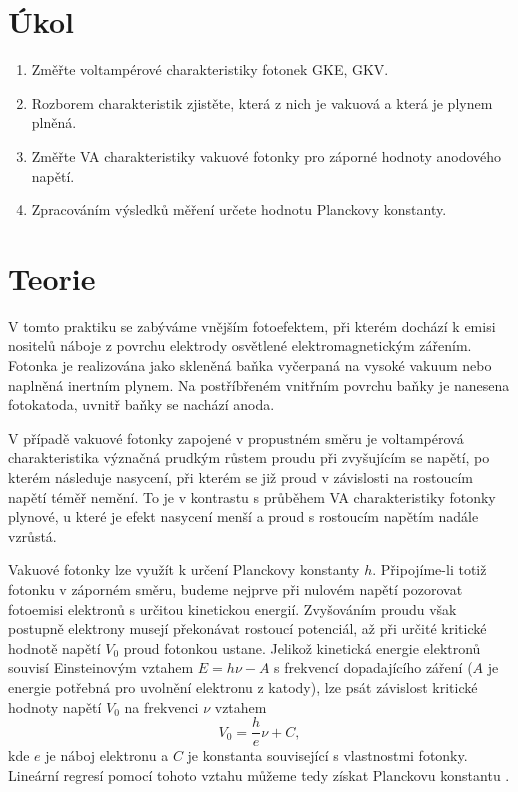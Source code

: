 \documentclass{protokol}
\begin{document}
  \section*{Úkol}

    \begin{enumerate}
      \item Změřte voltampérové charakteristiky fotonek GKE, GKV.
      \item Rozborem charakteristik zjistěte, která z nich je vakuová a která je plynem plněná.
      \item Změřte VA charakteristiky vakuové fotonky pro záporné hodnoty anodového napětí.
      \item Zpracováním výsledků měření určete hodnotu Planckovy konstanty.
    \end{enumerate}

  \section*{Teorie}

    V tomto praktiku se zabýváme vnějším fotoefektem, při kterém dochází k emisi nositelů náboje z povrchu elektrody osvětlené elektromagnetickým zářením. Fotonka je realizována jako skleněná baňka vyčerpaná na vysoké vakuum nebo naplněná inertním plynem. Na postří\-břeném vnitřním povrchu baňky je nanesena fotokatoda, uvnitř baňky se nachází anoda. 
    
    V případě vakuové fotonky zapojené v propustném směru je voltampérová charakteristika význačná prudkým růstem proudu při zvyšujícím se napětí, po kterém následuje nasycení, při kterém se již proud v závislosti na rostoucím napětí téměř nemění. To je v kontrastu s průběhem VA charakteristiky fotonky plynové, u které je efekt nasycení menší a proud s rostoucím napětím nadále vzrůstá.

    Vakuové fotonky lze využít k určení Planckovy konstanty $h$. Připojíme-li totiž fotonku v záporném směru, budeme nejprve při nulovém napětí pozorovat fotoemisi elektronů s určitou kinetickou energií. Zvyšováním proudu však postupně elektrony musejí překonávat rostoucí potenciál, až při určité kritické hodnotě napětí $V_0$ proud fotonkou ustane. Jelikož kinetická energie elektronů souvisí Einsteinovým vztahem $E = h \nu - A$ s frekvencí dopadajícího záření ($A$ je energie potřebná pro uvolnění elektronu z katody), lze psát závislost kritické hodnoty napětí $V_0$ na frekvenci $\nu$ vztahem 
    \begin{equation} \label{eq:vztah}
      V_0 = \frac{h}{e} \nu + C, 
    \end{equation}
    kde $e$ je náboj elektronu a $C$ je konstanta související s vlastnostmi fotonky. Lineární regresí pomocí tohoto vztahu můžeme tedy získat Planckovu konstantu \cite{pokyny}.
\end{document}
